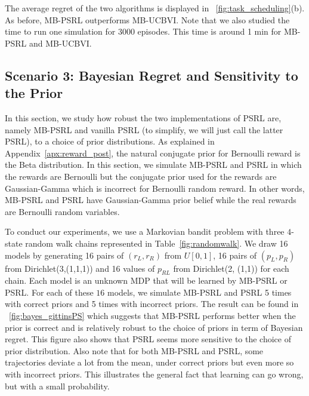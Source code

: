 The average regret of the two algorithms is displayed in \figurename~\ref{fig:task_scheduling}(b). As before, MB-PSRL outperforms MB-UCBVI.  Note that we also studied the time to run one simulation for 3000 episodes. This time is around 1 min for MB-PSRL and MB-UCBVI. 

\subsection{Scenario 3: Bayesian Regret and Sensitivity to the Prior}
\label{ssec:prior}

In this section, we study how robust the two implementations of PSRL are, namely MB-PSRL and vanilla PSRL (to simplify, we will just call the latter PSRL), to a choice of prior distributions. 
As explained in Appendix~\ref{apx:reward_post}, the natural conjugate prior for Bernoulli reward is the Beta distribution. 
In this section, we simulate MB-PSRL and PSRL in which the rewards are Bernoulli but the conjugate prior used for the rewards are Gaussian-Gamma which is incorrect for Bernoulli random reward. 
In other words, MB-PSRL and PSRL have Gaussian-Gamma prior belief while the real rewards are Bernoulli random variables. 


To conduct our experiments, we use a Markovian bandit problem with three $4$-state random walk chains represented in Table~\ref{fig:randomwalk}. 
We draw 16 models by generating 16 pairs of $(r_L, r_R)$ from $U[0,1]$, 16 pairs of $(p_L, p_R)$ from Dirichlet(3,(1,1,1)) and 16 values of $p_{RL}$ from Dirichlet(2, (1,1)) for each chain. 
Each model is an unknown MDP that will be learned by MB-PSRL or PSRL. 
For each of these $16$ models, we simulate MB-PSRL and PSRL 5 times with correct priors and 5 times with incorrect priors. 
The result can be found in \figurename~\ref{fig:bayes_gittinsPS} which suggests that MB-PSRL performs better when the prior is correct and is relatively robust to the choice of priors in term of Bayesian regret. 
This figure also shows that PSRL seems more sensitive to the choice of prior distribution. 
Also note that for both MB-PSRL and PSRL, some trajectories deviate a lot from the mean, under correct priors but even more so with  incorrect priors. 
This illustrates the general fact that learning can go wrong, but with a small probability.


